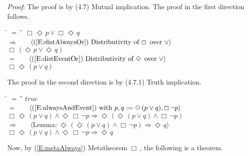 \documentclass[12pt, fleqn, leqno]{article}
\newcommand{\lgap}{2pt}                             %
\newcommand{\mymathindent}{24pt}                    %
\newcommand{\impl}{\ensuremath{\Rightarrow}}        %
\newcommand{\Event}{\Diamond\,}
\newcommand{\Always}{\Box\,}
\newcommand{\myqedtab}{\hspace{384pt}}              %
\newcommand{\Gll} {\langle}                         %
\newcommand{\Ggg} {\rangle}                         %
\newcommand{\Hint}[1]     {\ \ \ $\Gll              \mbox{#1} \Ggg$ }   %
\begin{document}
\emph{Proof}: The proof is by (4.7) Mutual implication.
The proof in the first direction follows.
\begin{tabbing}
\hspace{\mymathindent} \= $= \;$ \= \myqedtab \= \kill
  \> \>   $\Always\Event p \lor \Always\Event q$\\[\lgap]
  \> $\impl$  \>  \Hint{(\ref{E:distAlwaysOr}) Distributivity of $\Always$ over $\lor$}\\[\lgap]
  \> \>   $\Always(\Event p \lor \Event q)$\\[\lgap]
  \> $=$  \>  \Hint{(\ref{E:distEventOr}) Distributivity of $\Event$ over $\lor$}\\[\lgap]
  \> \>   $\Always\Event(p \lor q)$
\end{tabbing}
The proof in the second direction is by (4.7.1) Truth implication.
\begin{tabbing}
\hspace{\mymathindent} \= $= \;$ \= \myqedtab \= \kill
  \> \>   $true$\\[\lgap]
  \> $=$  \>  \Hint{(\ref{E:alwaysAndEvent}) with $p,q:=\Event(p\lor q),\Always\neg p$}\\[\lgap]
  \> \>   $\Always \Event(p\lor q) \land \Event \Always\neg p \impl \Event (\Event(p\lor q) \land \Always\neg p)$\\[\lgap]
  \> $\impl$  \>  \Hint{Lemma: $\Event (\Event(p\lor q) \land \Always\neg p)\impl\Event q$}\\[\lgap]
  \> \>   $\Always \Event(p\lor q) \land \Event \Always\neg p \impl \Event q$
\end{tabbing}
Now, by (\ref{E:metaAlways}) Metatheorem $\Always$, the following is a theorem.
\end{document}
